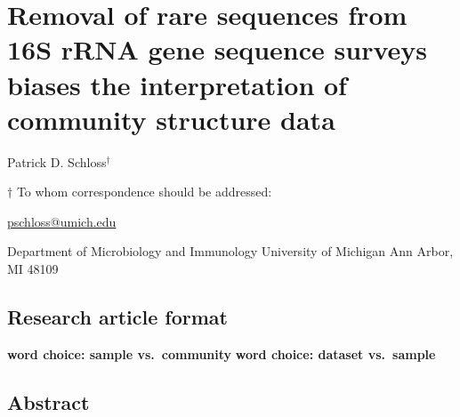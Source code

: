 \documentclass[
]{article}
\author{}
\date{\vspace{-2.5em}}
\begin{document}
\hypertarget{removal-of-rare-sequences-from-16s-rrna-gene-sequence-surveys-biases-the-interpretation-of-community-structure-data}{%
\section{Removal of rare sequences from 16S rRNA gene sequence surveys
biases the interpretation of community structure
data}\label{removal-of-rare-sequences-from-16s-rrna-gene-sequence-surveys-biases-the-interpretation-of-community-structure-data}}

\vspace{35mm}

Patrick D. Schloss\({^\dagger}\)

\vspace{40mm}

\(\dagger\) To whom correspondence should be addressed:

\href{mailto:pschloss@umich.edu}{pschloss@umich.edu}

Department of Microbiology and Immunology University of Michigan Ann
Arbor, MI 48109

\vspace{35mm}

\hypertarget{research-article-format}{%
\subsection{Research article format}\label{research-article-format}}

\textbf{word choice: sample vs.~community} \textbf{word choice: dataset
vs.~sample}

\newpage

\hypertarget{abstract}{%
\subsection{Abstract}\label{abstract}}
\end{document}
